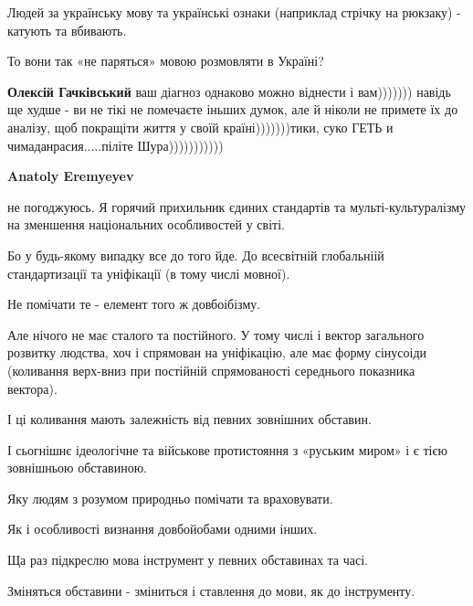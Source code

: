 \begin{itemize}
\begin{itemize}
\begin{itemize}
Людей за українську мову та українські ознаки (наприклад стрічку на рюкзаку) -
катують та вбивають.

То вони так «не паряться» мовою розмовляти в Україні?

 
\textbf{Олексій Гачківський} ваш діагноз однаково можно віднести і вам))))))) навідь ще худше - ви не тікі не помечаєте іньших думок, але й ніколи не примете їх до аналізу, щоб покращіти життя у своїй країні)))))))тики, суко ГЕТЬ и чимаданрасия.....піліте Шура)))))))))))

 
\textbf{Anatoly Eremyeyev} 

не погоджуюсь. Я горячий прихильник єдиних стандартів та мульті-культуралізму
на зменшення національних особливостей у світі.

Бо у будь-якому випадку все до того йде. До всесвітній глобальніій
стандартизації та уніфікації (в тому числі мовної).

Не помічати те - елемент того ж довбоібізму.

Але нічого не має сталого та постійного. У тому числі і вектор загального
розвитку людства, хоч і спрямован на уніфікацію, але має форму сінусоіди
(коливання верх-вниз при постійній спрямованості середнього показника вектора).

І ці коливання мають залежність від певних зовнішних обставин.

І сьогнішнє ідеологічне та військове протистояння з «руським миром» і є тією
зовнішньою обставиною.

Яку людям з розумом природньо помічати та враховувати.

Як і особливості визнання довбойобами одними інших.

Ща раз підкреслю мова інструмент у певних обставинах та часі.

Зміняться обставини - зміниться і ставлення до мови, як до інструменту.

 

\end{itemize}
\end{itemize}
\end{itemize}
